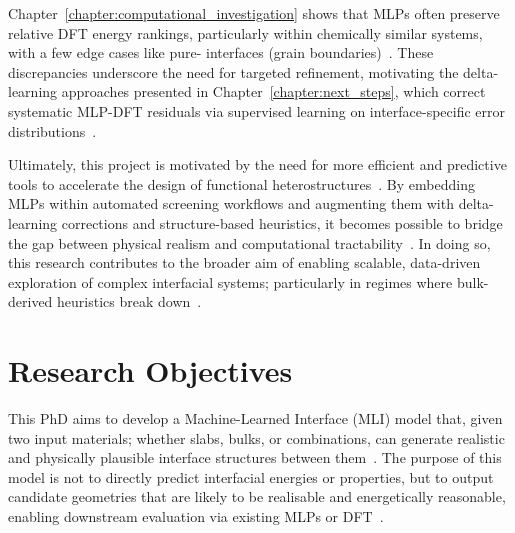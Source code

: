 \label{motivation_mlp_dft} %
Chapter~\ref{chapter:computational_investigation} shows that MLPs often preserve relative DFT energy rankings, particularly within chemically similar systems, with a few edge cases like pure- interfaces (grain boundaries)~\nocite{}.
These discrepancies underscore the need for targeted refinement, motivating the delta-learning approaches presented in Chapter~\ref{chapter:next_steps}, which correct systematic MLP-DFT residuals via supervised learning on interface-specific error distributions~\nocite{}.

\label{project_motivation} Ultimately, this project is motivated by the need for more efficient and predictive tools to accelerate the design of functional heterostructures~\nocite{}.
By embedding MLPs within automated screening workflows and augmenting them with delta-learning corrections and structure-based heuristics, it becomes possible to bridge the gap between physical realism and computational tractability~\nocite{}.
In doing so, this research contributes to the broader aim of enabling scalable, data-driven exploration of complex interfacial systems; particularly in regimes where bulk-derived heuristics break down~\nocite{}.

\newpage \section{Research Objectives} \label{section:research_objectives}

\label{objectives_mli_goal} This PhD aims to develop a Machine-Learned Interface (MLI) model that, given two input materials; whether slabs, bulks, or combinations, can generate realistic and physically plausible interface structures between them~\nocite{}.
The purpose of this model is not to directly predict interfacial energies or properties, but to output candidate geometries that are likely to be realisable and energetically reasonable, enabling downstream evaluation via existing MLPs or DFT~\nocite{}.


